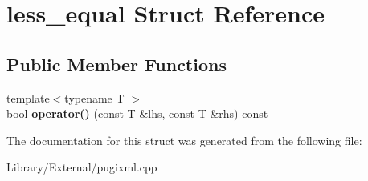 \hypertarget{structless__equal}{}\section{less\+\_\+equal Struct Reference}
\label{structless__equal}
\subsection*{Public Member Functions}
\begin{DoxyCompactItemize}
\item 
\hypertarget{structless__equal_a88d7a445c55ca234e3595aa086ff6a7d}{}{\footnotesize template$<$typename T $>$ }\\bool {\bfseries operator()} (const T \&lhs, const T \&rhs) const \label{structless__equal_a88d7a445c55ca234e3595aa086ff6a7d}

\end{DoxyCompactItemize}


The documentation for this struct was generated from the following file\+:\begin{DoxyCompactItemize}
\item 
Library/\+External/pugixml.\+cpp\end{DoxyCompactItemize}
